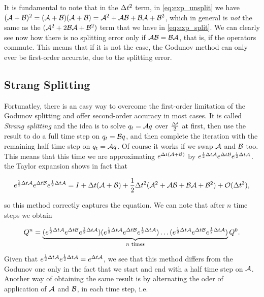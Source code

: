 \documentclass[journal,onecolumn]{IEEEtran}
\begin{document}
It is fundamental to note that in the $\Delta t^2$ term, in \eqref{eq:exp_unsplit} we have $(\mathcal{A} +\mathcal{B})^2=(\mathcal{A} +\mathcal{B})(\mathcal{A} +\mathcal{B})=\mathcal{A}^2+\mathcal{A}\mathcal{B}+\mathcal{B}\mathcal{A}+\mathcal{B}^2$, which in general is \textit{not} the same as the $(\mathcal{A}^2+2\mathcal{B}\mathcal{A}+\mathcal{B}^2)$ term that we have in \eqref{eq:exp_split}. We can clearly see now how there is no splitting error only if $\mathcal{A}\mathcal{B}=\mathcal{B}\mathcal{A}$, that is, if the operators commute. This means that if it is not the case, the Godunov method can only ever be first-order accurate, due to the splitting error.

\subsection{Strang Splitting}

Fortunatley, there is an easy way to overcome the first-order limitation of the Godunov splitting and offer second-order accuracy in most cases. It is called \textit{Strang splitting} and the idea is to solve $q_t=\mathcal{A} q$ over $\frac{\Delta t}{2}$ at first, then use the result to do a full time step on $q_t=\mathcal{B} q$, and then complete the iteration with the remaining half time step on $q_t=\mathcal{A} q$. Of course it works if we swap $\mathcal{A}$ and $\mathcal{B}$ too. This means that this time we are approximating $e^{\Delta t(\mathcal{A} +\mathcal{B})}$ by $e^{\frac{1}{2}\Delta t\mathcal{A}}e^{\Delta t\mathcal{B}}e^{\frac{1}{2}\Delta t\mathcal{A}}$. the Taylor expansion shows in fact that

\begin{equation}
	e^{\frac{1}{2}\Delta t\mathcal{A}}e^{\Delta t\mathcal{B}}e^{\frac{1}{2}\Delta t\mathcal{A}} = I+\Delta t(\mathcal{A} + \mathcal{B})+\frac{1}{2}\Delta t^2(\mathcal{A}^2+\mathcal{A}\mathcal{B}+\mathcal{B}\mathcal{A}+\mathcal{B}^2)+\mathcal{O}(\Delta t^3),
\end{equation}

so this method correctly captures the equation. We can note that after $n$ time steps we obtain

\begin{equation}\label{eq:recursion}
	Q^n = \underbrace{(e^{\frac{1}{2}\Delta t\mathcal{A}}e^{\Delta t\mathcal{B}}e^{\frac{1}{2}\Delta t\mathcal{A}})(e^{\frac{1}{2}\Delta t\mathcal{A}}e^{\Delta t\mathcal{B}}e^{\frac{1}{2}\Delta t\mathcal{A}})\dots(e^{\frac{1}{2}\Delta t\mathcal{A}}e^{\Delta t\mathcal{B}}e^{\frac{1}{2}\Delta t\mathcal{A}})}_{n\text{ times}}Q^0.
\end{equation}

Given that $e^{\frac{1}{2}\Delta t\mathcal{A}}e^{\frac{1}{2}\Delta t\mathcal{A}} = e^{\Delta t\mathcal{A}}$, we see that this method differs from the Godunov one only in the fact that we start and end with a half time step on $\mathcal{A}$. Another way of obtaining the same result is by alternating the oder of application of $\mathcal{A}$ and $\mathcal{B}$, in each time step, i.e.
\end{document}
